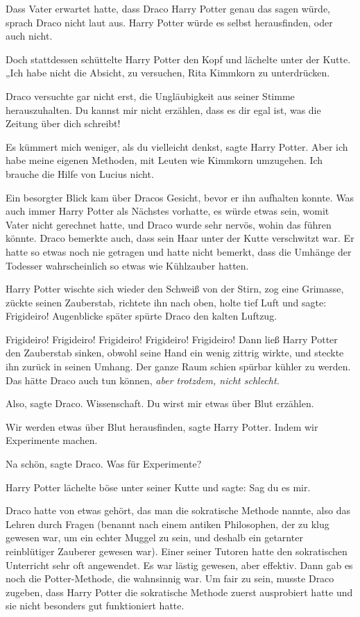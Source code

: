 Dass Vater erwartet hatte, dass Draco Harry Potter genau das sagen würde, sprach
Draco nicht laut aus. Harry Potter würde es selbst herausfinden, oder auch
nicht.

Doch stattdessen schüttelte Harry Potter den Kopf und lächelte unter der Kutte.
„Ich habe nicht die Absicht, zu versuchen, Rita Kimmkorn zu unterdrücken.\grqq{}

Draco versuchte gar nicht erst, die Ungläubigkeit aus seiner Stimme
herauszuhalten. \glqq Du kannst mir nicht erzählen, dass es dir egal ist, was
die Zeitung über dich schreibt!\grqq{}

\glqq Es kümmert mich weniger, als du vielleicht denkst\grqq{}, sagte Harry
Potter. \glqq Aber ich habe meine eigenen Methoden, mit Leuten wie Kimmkorn
umzugehen. Ich brauche die Hilfe von Lucius nicht.\grqq{}

Ein besorgter Blick kam über Dracos Gesicht, bevor er ihn aufhalten konnte. Was
auch immer Harry Potter als Nächstes vorhatte, es würde etwas sein, womit Vater
nicht gerechnet hatte, und Draco wurde sehr nervös, wohin das führen könnte.
Draco bemerkte auch, dass sein Haar unter der Kutte verschwitzt war. Er hatte so
etwas noch nie getragen und hatte nicht bemerkt, dass die Umhänge der Todesser
wahrscheinlich so etwas wie Kühlzauber hatten.

Harry Potter wischte sich wieder den Schweiß von der Stirn, zog eine Grimasse,
zückte seinen Zauberstab, richtete ihn nach oben, holte tief Luft und sagte:
\glqq Frigideiro!\grqq{} Augenblicke später spürte Draco den kalten Luftzug.

\glqq Frigideiro! Frigideiro! Frigideiro! Frigideiro! Frigideiro!\grqq{} Dann
ließ Harry Potter den Zauberstab sinken, obwohl seine Hand ein wenig zittrig
wirkte, und steckte ihn zurück in seinen Umhang. Der ganze Raum schien spürbar
kühler zu werden. Das hätte Draco auch tun können, \emph{aber trotzdem, nicht
schlecht.}

\glqq Also\grqq{}, sagte Draco. \glqq Wissenschaft. Du wirst mir etwas über Blut
erzählen.\grqq{}

\glqq Wir werden etwas über Blut herausfinden\grqq{}, sagte Harry Potter. \glqq
Indem wir Experimente machen.\grqq{}

\glqq Na schön\grqq{}, sagte Draco. \glqq Was für Experimente?\grqq{}

Harry Potter lächelte böse unter seiner Kutte und sagte: \glqq Sag du es
mir.\grqq{}

Draco hatte von etwas gehört, das man die sokratische Methode nannte, also das
Lehren durch Fragen (benannt nach einem antiken Philosophen, der zu klug gewesen
war, um ein echter Muggel zu sein, und deshalb ein getarnter reinblütiger
Zauberer gewesen war). Einer seiner Tutoren hatte den sokratischen Unterricht
sehr oft angewendet. Es war lästig gewesen, aber effektiv. Dann gab es noch die
Potter-Methode, die wahnsinnig war. Um fair zu sein, musste Draco zugeben, dass
Harry Potter die sokratische Methode zuerst ausprobiert hatte und sie nicht
besonders gut funktioniert hatte.

